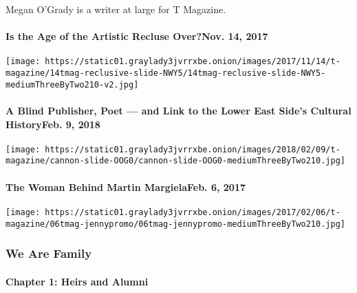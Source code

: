 Megan O'Grady is a writer at large for T Magazine.

\href{https://www.nytimes3xbfgragh.onion/2017/11/14/t-magazine/artistic-recluse-jd-salinger-thomas-pynchon.html}{}

\hypertarget{is-the-age-of-the-artistic-recluse-overnov-14-2017}{%
\paragraph{Is the Age of the Artistic Recluse Over?Nov. 14,
2017}\label{is-the-age-of-the-artistic-recluse-overnov-14-2017}}

\texttt{[image: https://static01.graylady3jvrrxbe.onion/images/2017/11/14/t-magazine/14tmag-reclusive-slide-NWY5/14tmag-reclusive-slide-NWY5-mediumThreeByTwo210-v2.jpg]}
\href{https://www.nytimes3xbfgragh.onion/2018/02/09/t-magazine/art/steve-cannon-david-hammons.html}{}

\hypertarget{a-blind-publisher-poet--and-link-to-the-lower-east-sides-cultural-historyfeb-9-2018}{%
\paragraph{A Blind Publisher, Poet --- and Link to the Lower East Side's
Cultural HistoryFeb. 9,
2018}\label{a-blind-publisher-poet--and-link-to-the-lower-east-sides-cultural-historyfeb-9-2018}}

\texttt{[image: https://static01.graylady3jvrrxbe.onion/images/2018/02/09/t-magazine/cannon-slide-OOG0/cannon-slide-OOG0-mediumThreeByTwo210.jpg]}
\href{https://www.nytimes3xbfgragh.onion/interactive/2017/02/06/t-magazine/jenny-meirens-margiela-interview.html}{}

\hypertarget{the-woman-behind-martin-margielafeb-6-2017}{%
\paragraph{The Woman Behind Martin MargielaFeb. 6,
2017}\label{the-woman-behind-martin-margielafeb-6-2017}}

\texttt{[image: https://static01.graylady3jvrrxbe.onion/images/2017/02/06/t-magazine/06tmag-jennypromo/06tmag-jennypromo-mediumThreeByTwo210.jpg]}

\hypertarget{we-are-family-1}{%
\subsubsection{We Are Family}\label{we-are-family-1}}

\hypertarget{chapter-1-heirs-and-alumni}{%
\paragraph{Chapter 1: Heirs and
Alumni}\label{chapter-1-heirs-and-alumni}}

